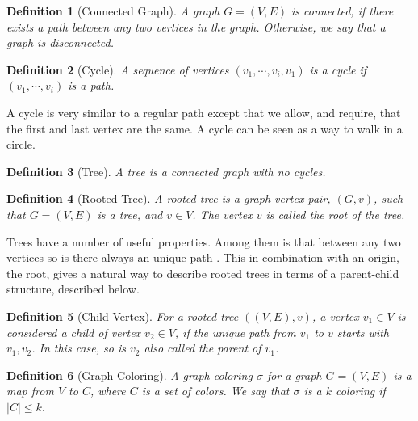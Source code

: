 \documentclass[a4paper]{article}
\newtheorem{definition}{Definition}[section]
\begin{document}

\begin{definition}[Connected Graph]
    A graph $G = (V,E)$ is connected, if there exists a path between any two
    vertices in the graph. Otherwise, we say that a graph is disconnected.
\end{definition}


\begin{definition}[Cycle]
    A sequence of vertices $(v_1,\cdots,v_i,v_1)$ is a cycle
    if $(v_1,\cdots,v_i)$ is a path.
\end{definition}

A cycle is very similar to a regular path except that we allow, and require,
that the first and last vertex are the same. A cycle can be seen as a way to walk
in a circle. 

\begin{definition}[Tree]{\cite{Trees}}
    A tree is a connected graph with no cycles.
\end{definition}
\begin{definition}[Rooted Tree]{\cite{Trees}}
    A rooted tree is a graph vertex pair, $(G,v)$, such that $G = (V,E)$ is a tree,
    and $v \in V$. The vertex $v$ is called the root of the tree.
\end{definition}

Trees have a number of useful properties. Among them is that between any two
vertices so is there always an unique path \cite{Trees}. This in combination
with an origin, the root, gives a natural way to describe rooted trees in terms
of a parent-child structure, described below.

\begin{definition}[Child Vertex]{\cite{Trees}}
    For a rooted tree $((V,E),v)$, a vertex $v_1 \in V$ is considered a child
    of vertex $v_2 \in V$, if the unique path from $v_1$ to $v$ starts with
    $v_1,v_2$. In this case, so is $v_2$ also called the parent of $v_1$.
\end{definition}


\begin{definition}[Graph Coloring]
    A graph coloring $\sigma$ for a graph $G = (V,E)$ is a map from $V$ to $C$,
    where $C$ is a set of colors. We say that $\sigma$
    is a $k$ coloring if $|C| \leq k$.
\end{definition}
\end{document}
